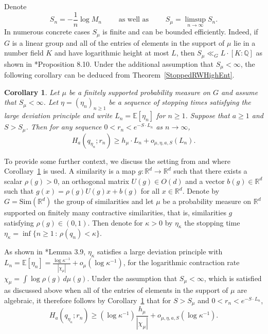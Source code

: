 \documentclass[10pt, english,oneside,reqno]{amsart}
\theoremstyle{plain}
\newtheorem{corollary}[theorem]{Corollary}
\theoremstyle{remark}
\numberwithin{equation}{section}
\numberwithin{figure}{section}
\newcommand{\Q}{\mathbb{Q}}
\newcommand{\R}{\mathbb{R}}
\begin{document}
Denote $$S_n = -\frac{1}{n} \log M_n \quad\quad \text{ as well as } \quad\quad S_{\mu} = \limsup_{n \to \infty} S_n.$$ In numerous concrete cases $S_{\mu}$ is finite and can be bounded efficiently. Indeed, if $G$ is a linear group and all of the entries of elements in the support of $\mu$ lie in a number field $K$ and have logarithmic height at most $L$, then  $S_{\mu} \ll_{G} L\cdot [K:\Q]$ as shown in \cite{KittleKogler2024ACSS}*{Proposition 8.10}. Under the additional assumption that $S_{\mu} < \infty$, the following corollary can be deduced from Theorem~\ref{StoppedRWHighEnt}.

\begin{corollary}\label{CorStoppedRWHighEnt} Let $\mu$ be a finitely supported probability measure on $G$ and assume that $S_{\mu} < \infty$. Let $\eta = (\eta_n)_{n \geq 1}$ be a sequence of stopping times satisfying the large deviation principle and write $L_n = \mathbb{E}[\eta_n]$ for $n\geq 1$. Suppose that $a \geq 1$ and $S > S_{\mu}$. Then for any sequence $0 < r_n < e^{-S \cdot L_n}$ as $n \to \infty$,
    $$H_a(q_{\eta_{n}} ; r_n) \geq h_{\mu}\cdot L_n + o_{\mu,\eta, a, S}(L_n).$$
\end{corollary}

To provide some further context, we discuss the setting from \cite{KittleKogler2024ACSS} and \cite{KittleKogler2024Dimension} where Corollary~\ref{CorStoppedRWHighEnt} is used. A similarity is a map $g:\R^d \to \R^d$ such that there exists a scalar $\rho(g) > 0$, an orthogonal matrix $U(g) \in O(d)$ and a vector $b(g) \in \R^d$ such that $g(x) = \rho(g)U(g)x + b(g)$ for all $x \in \R^d$. Denote by $G = \mathrm{Sim}(\R^d)$ the group of similarities and let $\mu$ be a probability measure on $\R^d$ supported on finitely many contractive similarities, that is, similarities $g$ satisfying $\rho(g) \in (0,1)$. Then denote for $\kappa > 0$ by $\eta_{\kappa}$ the stopping time $\eta_{\kappa} = \inf\{ n \geq 1 \,:\, \rho(q_n) < \kappa \}$. 

As shown in \cite{KittleKogler2024ACSS}*{Lemma 3.9}, $\eta_{\kappa}$ satisfies a large deviation principle with $L_n = \mathbb{E}[\eta_n] = \frac{\log \kappa^{-1}}{|\chi_{\mu}|} + o_{\mu}(\log \kappa^{-1})$, for the logarithmic contraction rate $\chi_{\mu} = \int \log \rho(g) \, d\mu(g)$. Under the assumption that $S_{\mu} < \infty$, which is satisfied as discussed above when all of the entries of elements in the support of $\mu$ are algebraic, it therefore follows by Corollary~\ref{CorStoppedRWHighEnt} that for $S > S_{\mu}$ and $0 < r_n < e^{-S\cdot L_n}$, \begin{equation}\label{CorApplication}
H_a(q_{\eta_{\kappa}}; r_n) \geq (\log \kappa^{-1})\frac{h_{\mu}}{|\chi_{\mu}|} + o_{\mu,\eta, a, S}(\log \kappa^{-1}).\end{equation}
\end{document}
